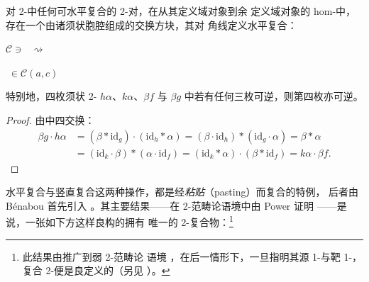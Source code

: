 \begin{lemma}\label{lem:naturality-of-whiskering}
对 2-\trCategory{}中任何可水平复合的 2-\trCell{}对，在从其定义域对象到余
定义域对象的 hom-\trCategory{}中，存在一个由诸须状胞腔组成的交换方块，其对
角线定义水平复合：
\begin{center}
$\mathcal{C}\ni$
$\;\rightsquigarrow\;$
$\;\in\mathcal{C}(a,c)$
\end{center}
特别地，四枚须状 2-\trCell{} $h\alpha$、$k\alpha$、$\beta f$ 与 $\beta g$
中若有任何三枚可逆，则第四枚亦可逆。
\end{lemma}

\begin{proof}
由中四交换：
\begin{align*}
\beta g\cdot h\alpha
  &= (\beta\ast\mathrm{id}_g)\cdot(\mathrm{id}_h\ast\alpha)
   = (\beta\cdot\mathrm{id}_h)\ast(\mathrm{id}_g\cdot\alpha)
   = \beta\ast\alpha\\
  &= (\mathrm{id}_k\cdot\beta)\ast(\alpha\cdot\mathrm{id}_f)
   = (\mathrm{id}_k\ast\alpha)\cdot(\beta\ast\mathrm{id}_f)
   = k\alpha\cdot\beta f.
\end{align*}
\end{proof}

水平复合与竖直复合这两种操作，都是经\emph{粘贴}（pasting）而复合的特例，
后者由 Bénabou 首先引入 \cite{bib9}。其主要结果——在 2-范畴论语境中由
Power 证明 \cite{bib91}——是说，一张如下方这样良构的\trPastingDiagram{}拥有
唯一的 2-\trCell{}复合物：\footnote{此结果由\trVerity{}推广到弱 2-范畴论
语境 \cite{bib130}，在后一情形下，一旦指明其源 1-\trCell{}与靶 1-\trCell，
复合 2-\trCell{}便是良定义的（另见 \cite{bib58}）。}

